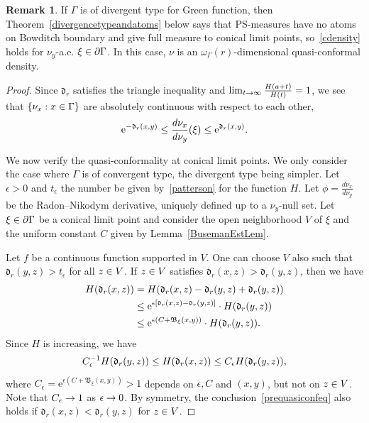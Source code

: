 \documentclass[10pt]{amsart}
\theoremstyle{definition}\newtheorem{defi}[theo]{Definition}\newtheorem{rema}[theo]{Remark}\newtheorem{exam}[theo]{Example}\newtheorem{exem}[theo]{Example}\newtheorem{nota}[theo]{Notation}
\newcommand{\pG}{\partial{\Gamma}}
\newcommand{\rme}{\mathrm{e}}
\newcommand{\fkd}{\mathfrak{d}}
\newcommand{\fkB}{\mathfrak{B}}
\let\oldin\in
\renewcommand{\in}{\mathchoice{\oldin}{\oldin}{\,\oldin\,}{\,\oldin\,}}
\let\oldle\le
\renewcommand{\le}{\mathchoice{\oldle}{\oldle}{\,\oldle\,}{\,\oldle\,}}
\renewcommand*{\to}{\mathchoice{\longrightarrow}{\rightarrow}{\rightarrow}{\rightarrow}}
\begin{document}
\begin{rema}
If $\Gamma$ is of divergent type for Green function, then Theorem~\ref{divergencetypeandatoms} below says that PS-measures have no atoms on Bowditch boundary and give full measure to conical limit points, so~\eqref{cdensity} holds for $\nu_y$-a.e. $\xi\in \pG$. In this case, $\nu$ is an $\omega_\Gamma(r)$-dimensional quasi-conformal density.
\end{rema}
\begin{proof}
Since $\fkd_r$ satisfies the triangle inequality and $\lim_{t\to\infty} \frac{H(a+t)}{H(t)}=1$, we see that $\{\nu_x: x\in \Gamma\}$ are absolutely continuous with respect to each other,
\begin{align*}
\rme^{-\fkd_r(x,y)}\le \frac{d\nu_x}{d\nu_y}(\xi) \le \rme^{\fkd_r(x,y)}.
\end{align*}


We now verify the quasi-conformality at conical limit points. We only consider the case where $\Gamma$ is of convergent type, the divergent type being simpler. Let $\epsilon> 0$ and $t_\epsilon$ the number be given by~\eqref{patterson} for the function $H$. Let $\phi=\frac{d\nu_x}{d\nu_y}$ be the Radon--Nikodym derivative, uniquely defined up to a $\nu_y$-null set. Let $\xi \in \pG$ be a conical limit point and consider the open neighborhood $V$ of $\xi$ and the uniform constant $C$ given by Lemma~\ref{BusemanEstLem}.

Let $f$ be a continuous function supported in $V$. One can choose $V$ also such that $\fkd_r(y, z) > t_\epsilon$ for all $z \in V$. If $z \in V$ satisfies $\fkd_r(x, z) >\fkd_r(y, z)$, then we have
\begin{align*}
H(\fkd_r(x,z)) &= H(\fkd_r(x,z)-\fkd_r(y,z)+\fkd_r(y,z)) \\
& \le \rme^{\epsilon[\fkd_r(x,z)-\fkd_r(y,z)]} \cdot H(\fkd_r(y,z)) \\
& \le \rme^{\epsilon (C + \fkB_\xi(x, y))}\cdot H(\fkd_r(y, z)).
\end{align*}
Since $H$ is increasing, we have
\begin{equation}\label{prequasiconfeq}
C_\epsilon^{-1} H(\fkd_r(y, z))\le H(\fkd_r(x, z)) \le C_\epsilon H(\fkd_r(y, z)),
\end{equation}
where $C_\epsilon= \rme^{\epsilon (C + \fkB_\xi(x, y))}>1$ depends on $\epsilon, C$ and $ (x,y)$, but not on $z\in V$. Note that $C_\epsilon\to 1$ as $\epsilon\to 0$. By symmetry, the conclusion~\eqref{prequasiconfeq} also holds if $\fkd_r(x, z) < \fkd_r(y, z)$ for $z \in V$.


\end{proof}
\end{document}
